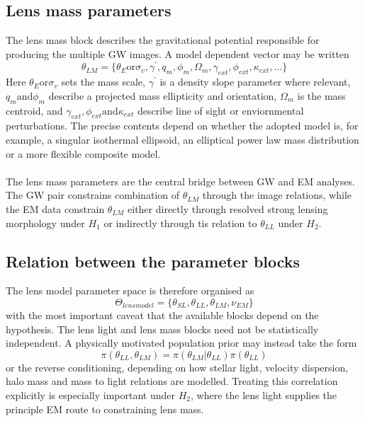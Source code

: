 \documentclass[pdflatex,sn-mathphys-num]{sn-jnl}%
\theoremstyle{thmstyleone}%
\theoremstyle{thmstyletwo}%
\theoremstyle{thmstylethree}%
\begin{document}
\subsection{Lens mass parameters}

The lens mass block describes the gravitational potential responsible for producing the multiple GW images.
A model dependent vector may be written
\begin{equation}
\theta_{LM} = \{\theta_E \text{or} \sigma_v,\gamma^{'},q_m,\phi_m,\Omega_m,\gamma_{ext},\phi_{ext},\kappa_{ext},...\}
\end{equation}
Here $\theta_E \text{or} \sigma_v$ sets the mass scale, $\gamma^{'}$ is a density slope parameter where relevant, $q_m \text{and} \phi_m$ describe a projected mass ellipticity and orientation, $\Omega_m$ is the mass centroid, and $\gamma_{ext}, \phi_{ext} \text{and} \kappa_{ext}$ describe line of sight or enviornmental perturbations.
The precise contents depend on whether the adopted model is, for example, a singular isothermal ellipsoid, an elliptical power law mass distribution or a more flexible composite model.\\
\\The lens mass parameters are the central bridge between GW and EM analyses.
The GW pair constrains combination of $\theta_{LM}$ through the image relations, while the EM data constrain $\theta_{LM}$ either directly through resolved strong lensing morphology under $H_1$ or indirectly through tis relation to $\theta_{LL}$ under $H_2$.

\subsection{Relation between the parameter blocks}

The lens model parameter space is therefore organised as
\begin{equation}
\Theta_{lens model} = \{\theta_{SL},\theta_{LL},\theta_{LM},\nu_{EM}\}
\end{equation}
with the most important caveat that the available blocks depend on the hypothesis. 
The lens light and lens mass blocks need not be statistically independent.
A physically motivated population prior may instead take the form
\begin{equation}
\pi(\theta_{LL},\theta_{LM})=\pi(\theta_{LM}|\theta_{LL})\pi(\theta_{LL})
\end{equation}
or the reverse conditioning, depending on how stellar light, velocity dispersion, halo mass and mass to light relations are modelled.
Treating this correlation explicitly is especially important under $H_2$, where the lens light supplies the principle EM route to constraining lens mass.
\end{document}
